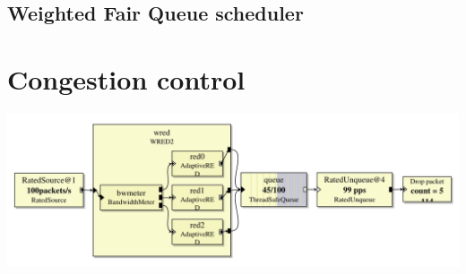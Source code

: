 \documentclass[a4paper]{article}
\begin{document}
  \subsection{Weighted Fair Queue scheduler}
  \section{Congestion control}
    \begin{center}
	  \includegraphics[scale=0.5]{wred2.pdf}
	  \label{fig:wred2}
    \end{center}
  
\end{document}
